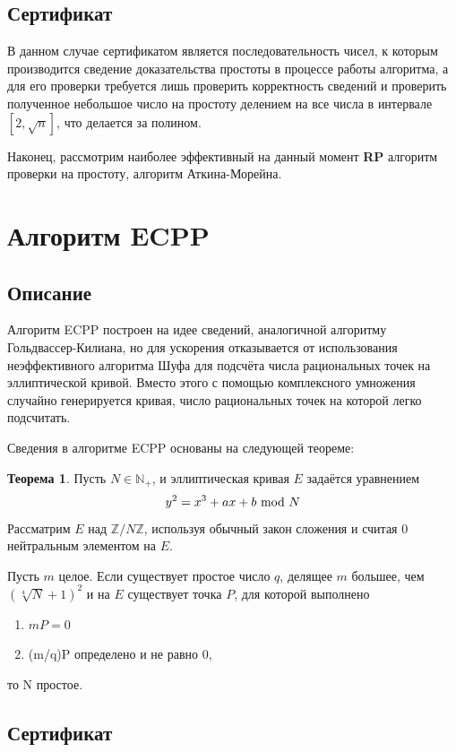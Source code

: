 \documentclass[12pt]{article}
\theoremstyle{definition}
\newtheorem{Th}{Теорема}
\numberwithin{Def}{section}
\numberwithin{Th}{section}
\numberwithin{St}{section}
\numberwithin{Cor}{section}
\begin{document}
\subsection{Сертификат}

В данном случае сертификатом является последовательность чисел, к которым
производится сведение доказательства простоты в процессе работы алгоритма,
а для его проверки требуется лишь проверить корректность сведений и 
проверить полученное небольшое число на простоту делением на все числа
в интервале $[2, \sqrt{n}]$, что делается за полином.

Наконец, рассмотрим наиболее эффективный на данный момент \textbf{RP} алгоритм
проверки на простоту, алгоритм Аткина-Морейна.

\section{Алгоритм ECPP}

\subsection{Описание}

Алгоритм ECPP построен на идее сведений, аналогичной алгоритму
Гольдвассер-Килиана, но для ускорения отказывается от использования 
неэффективного алгоритма Шуфа для подсчёта числа рациональных точек на
эллиптической кривой. Вместо этого с помощью комплексного умножения
случайно генерируется кривая, число рациональных точек на которой легко 
подсчитать.

Сведения в алгоритме ECPP основаны на следующей теореме:

\begin{Th}
Пусть $N\in\mathbb{N}_+$, и эллиптическая кривая $E$ задаётся уравнением
$$
y^2=x^3+ax+b\ \mathrm{mod}\ N
$$
Рассматрим $E$ над $\mathbb{Z}/N\mathbb{Z}$, используя обычный закон сложения
и считая $0$ нейтральным элементом на $E$.

Пусть $m$ целое. Если существует простое число $q$, делящее $m$ большее, чем
${\left(\sqrt[4]{N}+1\right)^2}$ и на $E$ существует точка $P$,
для которой выполнено
\begin{enumerate}[(1)]
	\item $mP=0$
	\item (m/q)P определено и не равно $0$,
\end{enumerate}
то N простое.
\end{Th}

\subsection{Сертификат}
\end{document}
